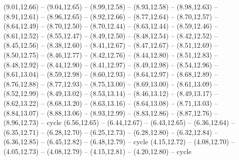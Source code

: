 {  (9.01,12.66) -- (9.04,12.65) -- (8.99,12.58) -- (8.93,12.58) -- (8.98,12.63) -- (8.91,12.61) -- (8.96,12.65) -- (8.92,12.66) -- (8.77,12.64) -- (8.70,12.57) -- (8.64,12.49) -- (8.70,12.50) -- (8.70,12.44) -- (8.63,12.44) -- (8.59,12.46) -- (8.61,12.52) -- (8.55,12.47) -- (8.49,12.50) -- (8.48,12.54) -- (8.42,12.52) -- (8.45,12.56) -- (8.38,12.60) -- (8.41,12.67) -- (8.47,12.67) -- (8.51,12.69) -- (8.50,12.75) -- (8.46,12.77) -- (8.42,12.76) -- (8.44,12.80) -- (8.51,12.83) -- (8.48,12.92) -- (8.44,12.90) -- (8.41,12.97) -- (8.49,12.98) -- (8.54,12.96) -- (8.61,13.04) -- (8.59,12.98) -- (8.60,12.93) -- (8.64,12.97) -- (8.68,12.89) -- (8.76,12.88) -- (8.77,12.93) -- (8.75,13.00) -- (8.69,13.00) -- (8.61,13.09) -- (8.52,12.99) -- (8.49,13.02) -- (8.53,13.14) -- (8.46,13.12) -- (8.49,13.17) -- (8.62,13.22) -- (8.68,13.20) -- (8.63,13.16) -- (8.64,13.08) -- (8.71,13.03) -- (8.84,13.07) -- (8.88,13.06) -- (8.93,12.99) -- (8.83,12.86) -- (8.87,12.76) -- (8.96,12.73) -- cycle
  (6.56,12.65) -- (6.44,12.67) -- (6.43,12.65) -- (6.36,12.64) -- (6.35,12.71) -- (6.28,12.70) -- (6.25,12.73) -- (6.28,12.80) -- (6.32,12.84) -- (6.36,12.85) -- (6.45,12.82) -- (6.48,12.79) -- cycle
  (4.15,12.72) -- (4.08,12.70) -- (4.05,12.73) -- (4.08,12.79) -- (4.15,12.81) -- (4.20,12.80) -- cycle}
\def\GebietListe{CZE,DE-SN,DE-BY,DE-RP,LUX,DE-SL,BEL,FRA,DE-SH,DNK,POL,AUT,CHE,ITA,NLD,DE-NI,DE-NW,LIE,DE-BW,DE-BB,DE-MV,DE-HB,DE-HH,DE-HE,DE-TH,DE-ST,DE-BE,DEU}

